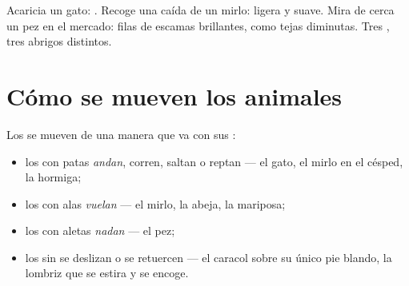 \begin{example}\label{ex:g1:animals-around-us:covering}
Acaricia un gato: . Recoge una  caída de un mirlo: ligera y
suave. Mira de cerca un pez en el mercado: filas de escamas brillantes,
como tejas diminutas. Tres , tres abrigos distintos.
\end{example}

\section{Cómo se mueven los animales}

\begin{proposition}\label{prop:g1:animals-around-us:moving}
Los  se mueven de una manera que va con sus :
\begin{itemize}
  \item los  con patas \emph{andan}, corren, saltan o reptan
        --- el gato, el mirlo en el césped, la hormiga;
  \item los  con alas \emph{vuelan} --- el mirlo,
        la abeja, la mariposa;
  \item los  con aletas \emph{nadan} --- el pez;
  \item los  sin  se deslizan o se retuercen ---
        el caracol sobre su único pie blando, la lombriz que se estira
        y se encoge.
\end{itemize}
\end{proposition}
\admitted

